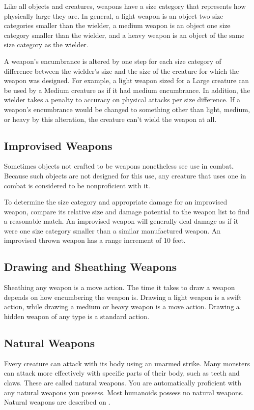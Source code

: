  Like all objects and creatures, weapons have a size category that represents how physically large they are. In general, a light weapon is an object two size categories smaller than the wielder, a medium weapon is an object one size category smaller than the wielder, and a heavy weapon is an object of the same size category as the wielder.

 A weapon's encumbrance is altered by one step for each size category of difference between the wielder's size and the size of the creature for which the weapon was designed. For example, a light weapon sized for a Large creature can be used by a Medium creature as if it had medium encumbrance. In addition, the wielder takes a  penalty to accuracy on physical attacks per size difference. If a weapon's encumbrance would be changed to something other than light, medium, or heavy by this alteration, the creature can't wield the weapon at all.

\subsection{Improvised Weapons} Sometimes objects not crafted to be weapons nonetheless see use in combat. Because such objects are not designed for this use, any creature that uses one in combat is considered to be nonproficient with it.

To determine the size category and appropriate damage for an improvised weapon, compare its relative size and damage potential to the weapon list to find a reasonable match. An improvised weapon will generally deal damage as if it were one size category smaller than a similar manufactured weapon. An improvised thrown weapon has a range increment of 10 feet.

\subsection{Drawing and Sheathing Weapons}\label{Drawing and Sheathing Weapons}
Sheathing any weapon is a move action. The time it takes to draw a weapon depends on how encumbering the weapon is. Drawing a light weapon is a swift action, while drawing a medium or heavy weapon is a move action. Drawing a hidden weapon of any type is a standard action.

\subsection{Natural Weapons}\label{Natural Weapons}
Every creature can attack with its body using an unarmed strike. Many monsters can attack more effectively with specific parts of their body, such as teeth and claws. These are called natural weapons. You are automatically proficient with any natural weapons you possess. Most humanoids possess no natural weapons. Natural weapons are described on .

